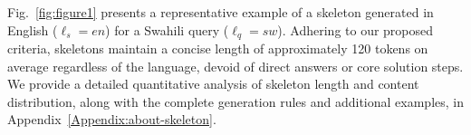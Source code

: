 Fig.~\ref{fig:figure1} presents a representative example of a skeleton generated in English ($\ell_s=en$) for a Swahili query ($\ell_q=sw$). Adhering to our proposed criteria, skeletons maintain a concise length of approximately 120 tokens on average regardless of the language, devoid of direct answers or core solution steps. We provide a detailed quantitative analysis of skeleton length and content distribution, along with the complete generation rules and additional examples, in Appendix~\ref{Appendix:about-skeleton}.
